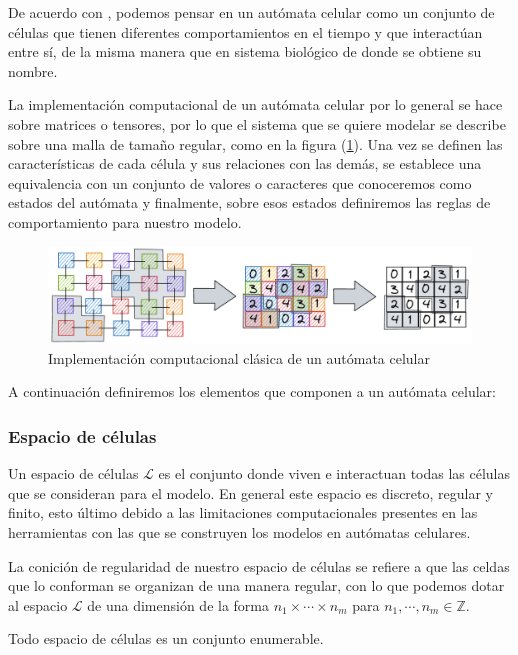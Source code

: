 De acuerdo con \cite{descripcionyAplicaciones}, podemos pensar en un autómata celular como un conjunto de células que tienen diferentes comportamientos en el tiempo y que interactúan entre sí, de la misma manera que en sistema biológico de donde se obtiene su nombre.

La implementación computacional de un autómata celular por lo general se hace sobre matrices o tensores, por lo que el sistema que se quiere modelar se describe sobre una malla de tamaño regular, como en la figura (\ref{fig:AC a matriz}). Una vez se definen las características de cada célula y sus relaciones con las demás, se establece una equivalencia con un conjunto de valores o caracteres que conoceremos como estados del autómata y finalmente, sobre esos estados definiremos las reglas de comportamiento para nuestro modelo.

\begin{figure}[h]
  \centering
    \includegraphics[width=1\textwidth]{Imagenes/ACaMatriz.PNG}
  \caption{Implementación computacional clásica de un autómata celular}
  \label{fig:AC a matriz}
\end{figure}

A continuación definiremos los elementos que componen a un autómata celular:

\subsubsection{Espacio de células}

Un espacio de células $\mathcal{L}$ es el conjunto donde viven e interactuan todas las células que se consideran para el modelo. En general este espacio es discreto, regular y finito, esto último debido a las limitaciones computacionales presentes en las herramientas con las que se construyen los modelos en autómatas celulares.

La conición de regularidad de nuestro espacio de células se refiere a que las celdas que lo conforman se organizan de una manera regular, con lo que podemos dotar al espacio $\mathcal{L}$ de una dimensión de la forma $n_1\times\cdots\times n_m$ para $n_1,\cdots,n_m\in\mathbb{Z}$.

\begin{proposicion}\label{pro:LEsEnumerable}
Todo espacio de células es un conjunto enumerable.
\end{proposicion}

